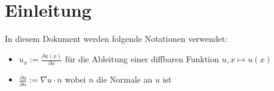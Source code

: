 
\setcounter{section}{-1}
\section{Einleitung}
In diesem Dokument werden folgende Notationen verwendet:
\begin{itemize}
	\item $u_x:=\frac{\partial u(x)}{\partial x}$ für die Ableitung einer diffbaren Funktion $u, x\mapsto u(x)$
	\item $\frac{\partial u}{\partial n}:=\nabla u\cdot n$ wobei $n$ die Normale an $u$ ist
\end{itemize}


